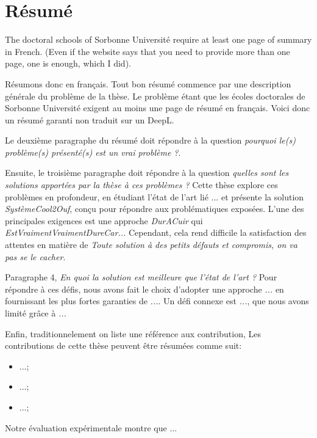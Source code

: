 %
\chapter{Résumé}
\label{appendix:resume-fr}

The doctoral schools of Sorbonne Université require at least one page of 
summary in French.
(Even if the website says that you need to provide more than one page,
one is enough,
which I did).

Résumons donc en français. 
Tout bon résumé commence par une description générale du problème de 
la thèse.
Le problème étant que les écoles doctorales de Sorbonne Université exigent 
au moins une page de résumé en français.
Voici donc un résumé garanti non traduit sur un DeepL.

Le deuxième paragraphe du résumé doit répondre à la question 
\textit{pourquoi le(s) problème(s) présenté(s) est un vrai problème ?}.

Ensuite, le troisième paragraphe doit répondre à la question
\textit{quelles sont les solutions apportées par la thèse à ces problèmes ?}
Cette thèse explore ces problèmes en profondeur,
en étudiant l'état de l'art lié ...
et présente la solution \textit{SystèmeCool2Ouf},
conçu pour répondre aux problématiques exposées.
L'une des principales exigences est une approche \textit{DurACuir}
qui \textit{EstVraimentVraimentDureCar...}
Cependant, cela rend difficile la satisfaction des attentes en matière
de \textit{Toute solution à des petits défauts et compromis, on va pas se le 
cacher}.

Paragraphe 4, \textit{En quoi la solution est meilleure que l'état de l'art ?}
Pour répondre à ces défis,
nous avons fait le choix d'adopter une approche \textit{...}
en fournissant les plus fortes garanties de \textit{...}.
Un défi connexe est \textit{...},
que nous avons limité grâce à \textit{...}

Enfin, traditionnelement on liste une référence aux contribution,
Les contributions de cette thèse peuvent être résumées comme suit:
\begin{itemize}
    \item ...;
    \item ...;
    \item ...;
\end{itemize}

Notre évaluation expérimentale montre que ... 
